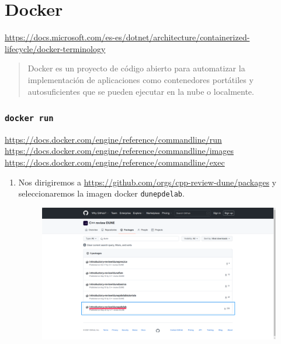 \section{Docker}

\url{https://docs.microsoft.com/es-es/dotnet/architecture/containerized-lifecycle/docker-terminology}

\begin{quote}
	Docker es un proyecto de código abierto para automatizar la implementación de aplicaciones como contenedores portátiles y autosuficientes que se pueden ejecutar en la nube o localmente.
\end{quote}

\subsubsection{\texttt{docker run}}

\url{https://docs.docker.com/engine/reference/commandline/run}
\url{https://docs.docker.com/engine/reference/commandline/images}
\url{https://docs.docker.com/engine/reference/commandline/exec}


\begin{enumerate}
	\item Nos dirigiremos a \url{https://github.com/orgs/cpp-review-dune/packages} y seleccionaremos la imagen docker \texttt{dunepdelab}.
	      \begin{figure}[ht!]
		      \centering
		      \includegraphics[width=.6\paperwidth]{images/imagedunepdelab}
	      \end{figure}
\end{enumerate}

